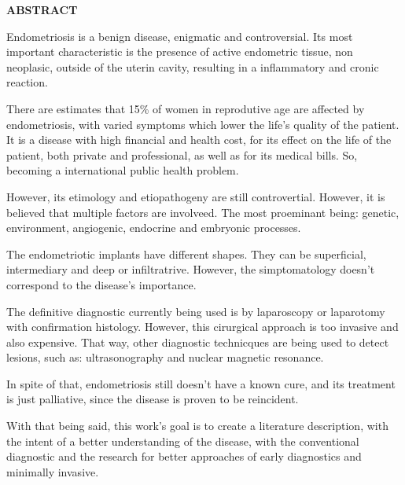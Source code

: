 \documentclass[12pt]{article} %
\begin{document}
\newpage
\begin{center}
\MakeUppercase{\textbf{Abstract}}
\end{center}

Endometriosis is a benign disease, enigmatic and controversial.  Its
most important characteristic is the presence of active endometric
tissue, non neoplasic, outside of the uterin cavity, resulting in a
inflammatory and cronic reaction.

There are estimates that 15\% of women in reprodutive age are affected
by endometriosis, with varied symptoms which lower the life's quality
of the patient. It is a disease with high financial and health cost,
for its effect on the life of the patient, both private and
professional, as well as for its medical bills. So, becoming a
international public health problem.

However, its etimology and etiopathogeny are still
controvertial. However, it is believed that multiple factors are
involveed. The most proeminant being: genetic, environment,
angiogenic, endocrine and embryonic processes.

The endometriotic implants have different shapes. They can be
superficial, intermediary and deep or infiltratrive. However, the
simptomatology doesn't correspond to the disease's importance.

The definitive diagnostic currently being used is by laparoscopy or
laparotomy with confirmation histology. However, this cirurgical
approach is too invasive and also expensive. That way, other
diagnostic technicques are being used to detect lesions, such as:
ultrasonography and nuclear magnetic resonance.

In spite of that, endometriosis still doesn't have a known cure, and
its treatment is just palliative, since the disease is proven
to be reincident.

With that being said, this work's goal is to create a literature
description, with the intent of a better understanding of the disease,
with the conventional diagnostic and the research for better
approaches of early diagnostics and minimally invasive.

\newpage

\listoffigures



\newpage

\tableofcontents


\newpage
\end{document}
